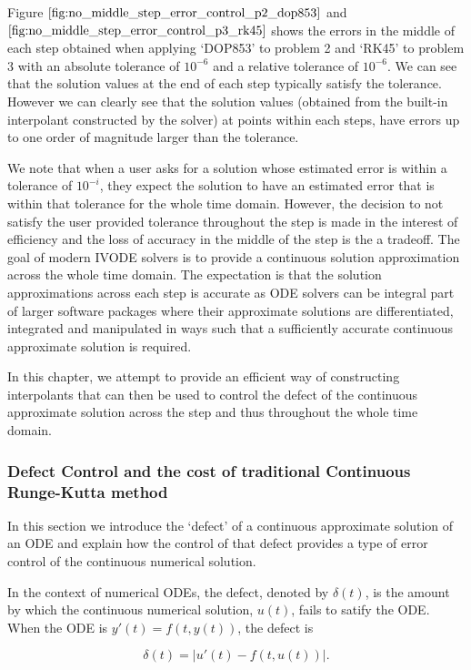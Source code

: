 \documentclass{article}
\begin{document}
Figure $\ref{fig:no_middle_step_error_control_p2_dop853}$ and $\ref{fig:no_middle_step_error_control_p3_rk45}$ shows the errors in the middle of each step obtained when applying `DOP853' to problem 2 and `RK45' to problem 3 with an absolute tolerance of $10^{-6}$ and a relative tolerance of $10^{-6}$. We can see that the solution values at the end of each step typically satisfy the tolerance. However we can clearly see that the solution values (obtained from the built-in interpolant constructed by the solver) at points within each steps, have errors up to one order of magnitude larger than the tolerance. 

We note that when a user asks for a solution whose estimated error is within a tolerance of $10^{-i}$, they expect the solution to have an estimated error that is within that tolerance for the whole time domain. However, the decision to not satisfy the user provided tolerance throughout the step is made in the interest of efficiency and the loss of accuracy in the middle of the step is the a tradeoff. The goal of modern IVODE solvers is to provide a continuous solution approximation across the whole time domain. The expectation is that the solution approximations across each step is accurate as ODE solvers can be integral part of larger software packages where their approximate solutions are differentiated, integrated and manipulated in ways such that a sufficiently accurate continuous approximate solution is required. 

In this chapter, we attempt to provide an efficient way of constructing interpolants that can then be used to control the defect of the continuous approximate solution across the step and thus throughout the whole time domain.

\subsubsection{Defect Control and the cost of traditional Continuous Runge-Kutta method}
\label{section:crk_related_work}
In this section we introduce the `defect' of a continuous approximate solution of an ODE and explain how the control of that defect provides a type of error control of the continuous numerical solution.

In the context of numerical ODEs, the defect, denoted by $\delta(t)$,  is the amount by which the continuous numerical solution, $u(t)$, fails to satify the ODE. When the ODE is $y'(t) = f(t, y(t))$, the defect is 

\begin{equation}
\delta(t) = |u'(t) - f(t, u(t))|.
\end{equation}
\end{document}
